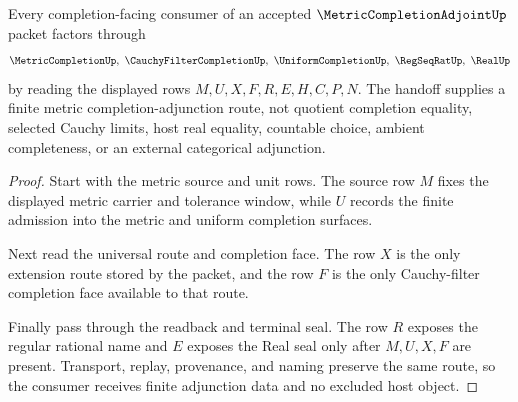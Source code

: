 \begin{theorem}
\label{thm:metric-completion-adjoint-finite-extension-route}
Every completion-facing consumer of an accepted $\MetricCompletionAdjointUp$ packet factors through
$$
\MetricCompletionUp,\ \CauchyFilterCompletionUp,\ \UniformCompletionUp,\ \RegSeqRatUp,\ \RealUp
$$
by reading the displayed rows $M,U,X,F,R,E,H,C,P,N$. The handoff supplies a finite metric completion-adjunction route, not quotient completion equality, selected Cauchy limits, host real equality, countable choice, ambient completeness, or an external categorical adjunction.
\end{theorem}
\begin{proof}
Start with the metric source and unit rows. The source row $M$ fixes the displayed metric carrier and tolerance window, while $U$ records the finite admission into the metric and uniform completion surfaces.

Next read the universal route and completion face. The row $X$ is the only extension route stored by the packet, and the row $F$ is the only Cauchy-filter completion face available to that route.

Finally pass through the readback and terminal seal. The row $R$ exposes the regular rational name and $E$ exposes the Real seal only after $M,U,X,F$ are present. Transport, replay, provenance, and naming preserve the same route, so the consumer receives finite adjunction data and no excluded host object.
\end{proof}





